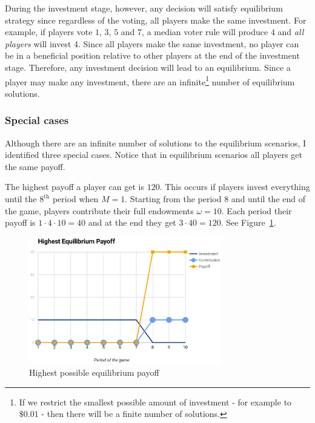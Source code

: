 			During the investment stage, however, any decision will satisfy equilibrium strategy since regardless of the voting, all players make the same investment. For example, if players vote $1$, $3$, $5$ and $7$, a median voter rule will produce $4$ and \emph{all players} will invest $4$. Since all players make the same investment, no player can be in a beneficial position relative to other players at the end of the investment stage. Therefore, any investment decision will lead to an equilibrium. Since a player may make any investment, there are an infinite\footnote{If we restrict the smallest possible amount of investment - for example to $\$0.01$ - then there will be a finite number of solutions.} number of equilibrium solutions.

		\subsubsection{Special cases}

			Although there are an infinite number of solutions to the equilibrium scenarios, I identified three special cases. Notice that in equilibrium scenarios all players get the same payoff.

			The highest payoff a player can get is $120$. This occurs if players invest everything until the $8^\text{th}$ period when $M = 1$. Starting from the period $8$ and until the end of the game, players contribute their full endowments $\omega = 10$. Each period their payoff is $1 \cdot 4 \cdot 10 = 40$ and at the end they get $3 \cdot 40 = 120$. See Figure~\ref{fig:nash-highest}.

			\begin{figure}
				\begin{center}
					\includegraphics[width=8.4cm]{resources/eps/nash-highest.eps}
					\caption{Highest possible equilibrium payoff} 
					\label{fig:nash-highest}
				\end{center}
			\end{figure}

